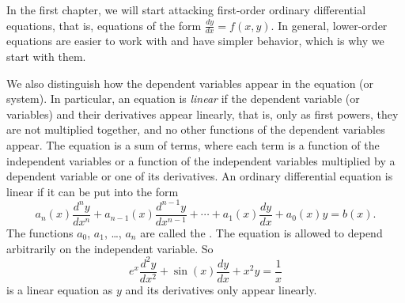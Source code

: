 In the first chapter, we will start attacking first-order ordinary
differential equations, that is, equations of the form $\frac{dy}{dx} = f(x,y)$.
In general, lower-order equations are easier to work with and have simpler
behavior, which is why we start with them.

\medskip

We also distinguish how the dependent variables appear in the equation (or
system).  In particular, an equation is
\emph{linear} if the
dependent variable (or variables) and their derivatives appear linearly,
that is, only as first powers, they are not multiplied together,
and no other functions of the dependent
variables appear.  The equation is a sum of terms,
where each term is
a function of the independent variables
or 
a function of the independent variables
multiplied by a dependent variable
or one of its derivatives.
An ordinary differential equation is linear if it can be
put into the form
\begin{equation} \label{classification:eqlingen}
a_n(x) \frac{d^n y}{dx^n} + 
a_{n-1}(x) \frac{d^{n-1} y}{dx^{n-1}} + 
\cdots
+
a_{1}(x) \frac{dy}{dx}
+
a_{0}(x) y = b(x) .
\end{equation}
The functions $a_0$, $a_1$, \ldots, $a_n$ are called the
\emph{}.
The equation is allowed to depend arbitrarily on the independent variable.
So 
\begin{equation} \label{classification:eqlinex}
e^x \frac{d^2 y}{dx^2} + 
\sin(x) \frac{d y}{dx} + 
x^2 y
=
\frac{1}{x}
\end{equation}
is a linear equation as $y$ and its derivatives only appear linearly.

